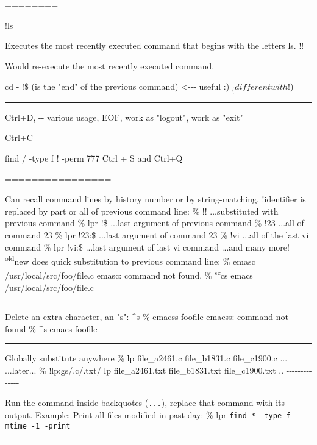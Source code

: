 \documentclass[11pt]{article}
\begin{document}
========

!ls

Executes the most recently executed command that begins with the letters
ls. !!

Would re-execute the most recently executed command.

cd - !\$ (is the "end" of the previous command) \textless{}-\/-\/-
useful :) \(_ (different with !\))

\begin{center}\rule{0.5\linewidth}{\linethickness}\end{center}

Ctrl+D, -\/- various usage, EOF, work as "logout", work as "exit"

Ctrl+C

find / -type f ! -perm 777 Ctrl + S and Ctrl+Q

================

Can recall command lines by history number or by string-matching.
!identifier is replaced by part or all of previous command line: \% !!
...substituted with previous command \% lpr !\$ ...last argument of
previous command \% !23 ...all of command 23 \% lpr !23:\$ ...last
argument of command 23 \% !vi ...all of the last vi command \% lpr
!vi:\$ ...last argument of last vi command ...and many more!
\textsuperscript{old}new does quick substitution to previous command
line: \% emasc /usr/local/src/foo/file.c emasc: command not found. \%
\textsuperscript{sc}cs emacs /usr/local/src/foo/file.c

\begin{center}\rule{0.5\linewidth}{\linethickness}\end{center}

Delete an extra character, an "s": \^{}s \% emacss foofile emacss:
command not found \% \^{}s emacs foofile

\begin{center}\rule{0.5\linewidth}{\linethickness}\end{center}

Globally substitute anywhere \% lp file\_a2461.c file\_b1831.c
file\_c1900.c ... ...later... \% !lp:gs/.c/.txt/ lp file\_a2461.txt
file\_b1831.txt file\_c1900.txt ..
-\/-\/-\/-\/-\/-\/-\/-\/-\/-\/-\/-\/-\/-

Run the command inside backquotes (\texttt{...}), replace that command
with its output. Example: Print all files modified in past day: \% lpr
\texttt{find\ *\ -type\ f\ -mtime\ -1\ -print}

\begin{center}\rule{0.5\linewidth}{\linethickness}\end{center}
\end{document}

